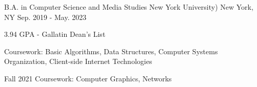 

\begin{cventries}

  \cventry
    {B.A. in Computer Science and Media Studies} %
    {New York University)} %
    {New York, NY} %
    {Sep. 2019 - May. 2023} %
    {
      \begin{cvitems} %
        \item {3.94 GPA - Gallatin Dean's List}
        \item {Coursework: Basic Algorithms, Data Structures, Computer Systems Organization, Client-side Internet Technologies}
        \item {Fall 2021 Coursework: Computer Graphics, Networks}
      \end{cvitems}
    }

\end{cventries}

